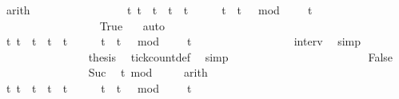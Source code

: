 \begin{isabellebody}
\ arith\ \isanewline
\ \ \ \ \ \ \ \ \ \ \ \ \ \ \isamarkupfalse%
\ {\isacartoucheopen}{\isacharbraceleft}t{\isachardot}\ {\isacharparenleft}t\ {\isacharequal}\ t\ {\isasymor}\ t\ {\isacharequal}\ t\ {\isacharplus}\ {}{\isacharparenright}\ {\isasymand}\ {}\ {\isasymle}\ t\ {\isasymand}\ {\isacharparenleft}t\ {\isacharminus}\ {}{\isacharparenright}\ mod\ {}\ {\isacharequal}\ {}{\isacharbraceright}\ {\isacharequal}\ {\isacharbraceleft}t\isanewline
\ \ \ \ \ \ \ \ \ \ \ \ \ \ \ \ \isamarkupfalse%
\ True\ \ \isamarkupfalse%
\ auto\isanewline
\ \ \ \ \ \ \ \ \ \ \ \ \ \ \isamarkupfalse%
\ {\isacartoucheopen}{\isacharbraceleft}t{\isachardot}\ t\ {\isasymle}\ t\ {\isasymand}\ t\ {\isacharless}\ t\ {\isacharplus}\ {}\ {\isasymand}\ {}\ {\isasymle}\ t\ {\isasymand}\ {\isacharparenleft}t\ {\isacharminus}\ {}{\isacharparenright}\ mod\ {}\ {\isacharequal}\ {}{\isacharbraceright}\ {\isacharequal}\ {\isacharbraceleft}t\isanewline
\ \ \ \ \ \ \ \ \ \ \ \ \ \ \ \ \isamarkupfalse%
\ interv{\isacharunderscore}{}\ \isamarkupfalse%
\ simp\isanewline
\ \ \ \ \ \ \ \ \ \ \ \ \ \ \isamarkupfalse%
\ {\isacharquery}thesis\ \isamarkupfalse%
\ tick{\isacharunderscore}count{\isacharunderscore}def\ \isamarkupfalse%
\ simp\isanewline
\ \ \ \ \ \ \ \ \ \ \isamarkupfalse%
\isanewline
\ \ \ \ \ \ \ \ \ \ \ \ \isamarkupfalse%
\ False\isanewline
\ \ \ \ \ \ \ \ \ \ \ \ \ \ \isamarkupfalse%
\ Suc\ \isamarkupfalse%
\ {\isacartoucheopen}t\ mod\ {}\ {\isacharequal}\ {}{\isacartoucheclose}\ \isamarkupfalse%
\ arith\isanewline
\ \ \ \ \ \ \ \ \ \ \ \ \ \ \isamarkupfalse%
\ {\isacartoucheopen}{\isacharbraceleft}t{\isachardot}\ {\isacharparenleft}t\ {\isacharequal}\ t\ {\isasymor}\ t\ {\isacharequal}\ t\ {\isacharplus}\ {}{\isacharparenright}\ {\isasymand}\ {}\ {\isasymle}\ t\ {\isasymand}\ {\isacharparenleft}t\ {\isacharminus}\ {}{\isacharparenright}\ mod\ {}\ {\isacharequal}\ {}{\isacharbraceright}\ {\isacharequal}\ {\isacharbraceleft}t\isanewline

\end{isabellebody}
